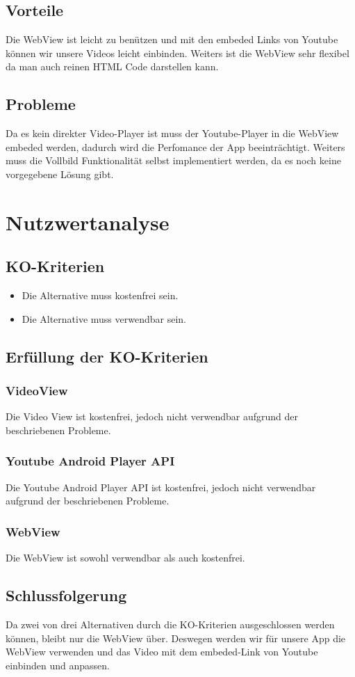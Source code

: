 \documentclass[FIPLY_base.tex]{subfiles}
\begin{document}
\subsection{Vorteile}
Die WebView ist leicht zu benützen und mit den embeded Links von Youtube können wir unsere Videos leicht einbinden. Weiters ist die WebView sehr flexibel da man auch reinen HTML Code darstellen kann.
\subsection{Probleme}
Da es kein direkter Video-Player ist muss der Youtube-Player in die WebView embeded werden, dadurch wird die Perfomance der App beeinträchtigt. Weiters muss die Vollbild Funktionalität selbst implementiert werden, da es noch keine vorgegebene Lösung gibt.


\section{Nutzwertanalyse}
\subsection{KO-Kriterien}
\begin{itemize}
\item Die Alternative muss kostenfrei sein.
\item Die Alternative muss verwendbar sein.
\end{itemize}
\subsection{Erfüllung der KO-Kriterien}
\subsubsection{VideoView}
Die Video View ist kostenfrei, jedoch nicht verwendbar aufgrund der beschriebenen Probleme.
\subsubsection{Youtube Android Player API}
Die Youtube Android Player API ist kostenfrei, jedoch nicht verwendbar aufgrund der beschriebenen Probleme.
\subsubsection{WebView}
Die WebView ist sowohl verwendbar als auch kostenfrei.
\subsection{Schlussfolgerung}
Da zwei von drei Alternativen durch die KO-Kriterien ausgeschlossen werden können, bleibt nur die WebView über. Deswegen werden wir für unsere App die WebView verwenden und das Video mit dem embeded-Link von Youtube einbinden und anpassen.
\end{document}
